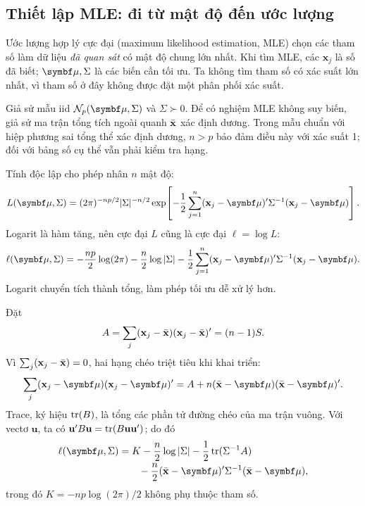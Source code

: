 \subsection{Thiết lập MLE: đi từ mật độ đến ước lượng}
\label{sec:mle_derivation}
Ước lượng hợp lý cực đại (maximum likelihood estimation, MLE) chọn các
tham số làm dữ liệu \emph{đã quan sát} có mật độ chung lớn nhất. Khi tìm
MLE, các $\mathbf x_j$ là số đã biết; $\vmu,\Sigma$ là các biến cần tối ưu.
Ta không tìm tham số có xác suất lớn nhất, vì tham số ở đây không được
đặt một phân phối xác suất.

Giả sử mẫu iid $\N_p(\vmu,\Sigma)$ và $\Sigma\succ0$. Để có nghiệm MLE
không suy biến, giả sử ma trận tổng tích ngoài quanh $\bar{\mathbf x}$ xác định dương.
Trong mẫu chuẩn với hiệp phương sai tổng thể xác định dương, $n>p$ bảo
đảm điều này với xác suất 1; đối với bảng số cụ thể vẫn phải kiểm tra hạng.

Tính độc lập cho phép nhân $n$ mật độ:
\begin{equation}
 L(\vmu,\Sigma)=(2\pi)^{-np/2}|\Sigma|^{-n/2}
 \exp\!\left[-\frac12\sum_{j=1}^n
 (\mathbf x_j-\vmu)'\Sigma^{-1}(\mathbf x_j-\vmu)\right].
 \label{eq:mlelikelihood}
\end{equation}
Logarit là hàm tăng, nên cực đại $L$ cũng là cực đại $\ell=\log L$:
\begin{equation}
 \ell(\vmu,\Sigma)=-\frac{np}2\log(2\pi)-\frac n2\log|\Sigma|
 -\frac12\sum_{j=1}^n(\mathbf x_j-\vmu)'\Sigma^{-1}(\mathbf x_j-\vmu).
 \label{eq:mleloglikelihood}
\end{equation}
Logarit chuyển tích thành tổng, làm phép tối ưu dễ xử lý hơn.

Đặt
\[
 A=\sum_j(\mathbf x_j-\bar{\mathbf x})(\mathbf x_j-\bar{\mathbf x})'=(n-1)S.
\]
Vì $\sum_j(\mathbf x_j-\bar{\mathbf x})=0$, hai hạng chéo triệt tiêu khi khai triển:
\begin{equation}
 \sum_j(\mathbf x_j-\vmu)(\mathbf x_j-\vmu)'
 =A+n(\xbar-\vmu)(\xbar-\vmu)'.
 \label{eq:mlescatterdecomposition}
\end{equation}
Trace, ký hiệu $\operatorname{tr}(B)$, là tổng các phần tử đường chéo của ma trận vuông.
Với vectơ $\mathbf u$, ta có
$\mathbf u'B\mathbf u=\operatorname{tr}(B\mathbf u\mathbf u')$; do đó
\begin{align}
 \ell(\vmu,\Sigma)
 &=K-\frac n2\log|\Sigma|-\frac12\tr(\Sigma^{-1}A)
 \notag\\[-2pt]
 &\qquad-\frac n2(\xbar-\vmu)'\Sigma^{-1}(\xbar-\vmu),
 \label{eq:mlemeansplit}
\end{align}
trong đó $K=-np\log(2\pi)/2$ không phụ thuộc tham số.

